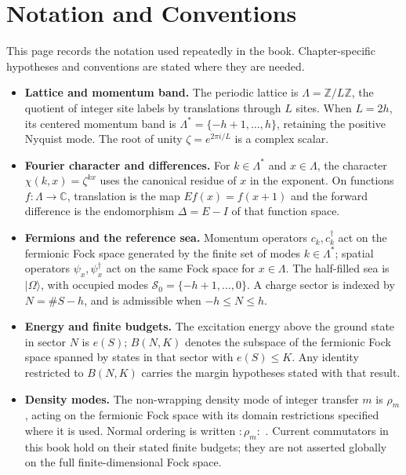 \chapter*{Notation and Conventions}

\begingroup\small
This page records the notation used repeatedly in the book. Chapter-specific
hypotheses and conventions are stated where they are needed.

\begin{itemize}
    \setlength{\itemsep}{2pt}
    \setlength{\topsep}{3pt}
    \item \textbf{Lattice and momentum band.} The periodic lattice is
    $\Lambda=\mathbb{Z}/L\mathbb{Z}$, the quotient of integer site labels by
    translations through $L$ sites. When $L=2h$, its centered momentum band is
    $\Lambda^*=\{-h+1,\ldots,h\}$, retaining the positive Nyquist mode.
    The root of unity $\zeta=e^{2\pi i/L}$ is a complex scalar.

    \item \textbf{Fourier character and differences.} For $k\in\Lambda^*$ and
    $x\in\Lambda$, the character $\chi(k,x)=\zeta^{kx}$ uses the canonical
    residue of $x$ in the exponent. On functions $f:\Lambda\to\mathbb C$,
    translation is the map $E f(x)=f(x+1)$ and the forward difference is the
    endomorphism $\Delta=E-I$ of that function space.

    \item \textbf{Fermions and the reference sea.} Momentum operators
    $c_k,c_k^\dagger$ act on the fermionic Fock space generated by the finite
    set of modes $k\in\Lambda^*$; spatial operators $\psi_x,\psi_x^\dagger$
    act on the same Fock space for $x\in\Lambda$.
    The half-filled sea is $|\Omega\rangle$, with occupied modes
    $\mathcal{S}_0=\{-h+1,\ldots,0\}$. A charge sector is indexed by
    $N=\#S-h$, and is admissible when $-h\le N\le h$.

    \item \textbf{Energy and finite budgets.} The excitation energy above the
    ground state in sector $N$ is $e(S)$; $B(N,K)$ denotes the subspace of
    the fermionic Fock space spanned by states in that sector with $e(S)\le K$.
    Any identity restricted to $B(N,K)$
    carries the margin hypotheses stated with that result.

    \item \textbf{Density modes.} The non-wrapping density mode of integer
    transfer $m$ is $\rho_m$, acting on the fermionic Fock space with its
    domain restrictions specified where it is used. Normal ordering is written
    $:\!\rho_m\!:$ .
    Current commutators in this book hold on their stated finite budgets;
    they are not asserted globally on the full finite-dimensional Fock space.


\end{itemize}
